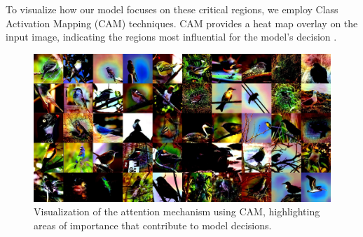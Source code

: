 To visualize how our model focuses on these critical regions, we employ Class Activation Mapping (CAM) techniques. CAM provides a heat map overlay on the input image, indicating the regions most influential for the model's decision \cite{zhou2016learning}.

\begin{figure}[h]
    \centering
    \includegraphics[width=\linewidth]{res/output_grid.jpg}
    \caption{Visualization of the attention mechanism using CAM, highlighting areas of importance that contribute to model decisions.}
    \label{fig:cam_attention}
\end{figure}
